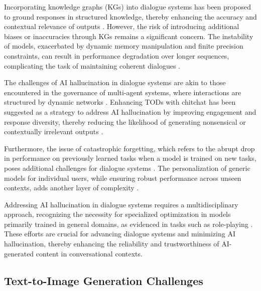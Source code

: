 Incorporating knowledge graphs (KGs) into dialogue systems has been proposed to ground responses in structured knowledge, thereby enhancing the accuracy and contextual relevance of outputs \cite{chaudhuri2021groundingdialoguesystemsknowledge}. However, the risk of introducing additional biases or inaccuracies through KGs remains a significant concern. The instability of models, exacerbated by dynamic memory manipulation and finite precision constraints, can result in performance degradation over longer sequences, complicating the task of maintaining coherent dialogues .



The challenges of AI hallucination in dialogue systems are akin to those encountered in the governance of multi-agent systems, where interactions are structured by dynamic networks \cite{chen2024adaptivenetworkinterventioncomplex}. Enhancing TODs with chitchat has been suggested as a strategy to address AI hallucination by improving engagement and response diversity, thereby reducing the likelihood of generating nonsensical or contextually irrelevant outputs \cite{stricker2024enhancingtaskorienteddialogueschitchat}. 



Furthermore, the issue of catastrophic forgetting, which refers to the abrupt drop in performance on previously learned tasks when a model is trained on new tasks, poses additional challenges for dialogue systems \cite{goldfarb2022analysiscatastrophicforgettingrandom}. The personalization of generic models for individual users, while ensuring robust performance across unseen contexts, adds another layer of complexity \cite{kaur2024cropcontextwiserobuststatic}. 



Addressing AI hallucination in dialogue systems requires a multidisciplinary approach, recognizing the necessity for specialized optimization in models primarily trained in general domains, as evidenced in tasks such as role-playing \cite{tao2024rolecraftglmadvancingpersonalizedroleplaying}. These efforts are crucial for advancing dialogue systems and minimizing AI hallucination, thereby enhancing the reliability and trustworthiness of AI-generated content in conversational contexts.



\subsection{Text-to-Image Generation Challenges} \label{subsec:Text-to-Image Generation Challenges}

